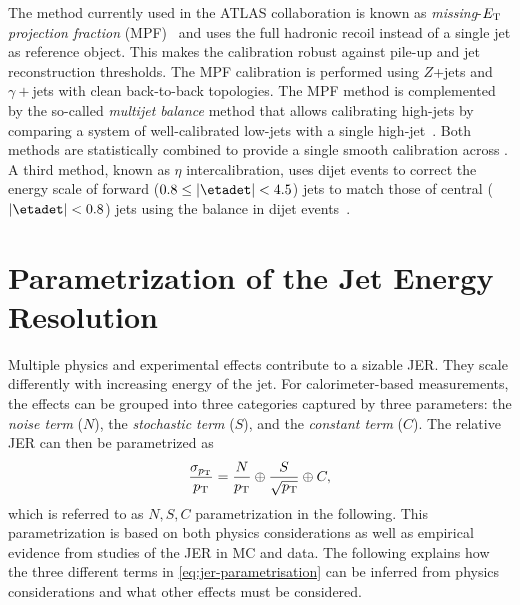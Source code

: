 The method currently used in the ATLAS collaboration is known as \emph{missing}-$E_{\rm T}$ \emph{projection fraction} (MPF)~\cite{PERF-2014-02} and uses the full hadronic recoil instead of a single jet as reference object. This makes the calibration robust against pile-up and jet reconstruction thresholds. The MPF calibration is performed using $Z$+jets and $\gamma+$jets with clean back-to-back topologies. 
The MPF method is complemented by the so-called \emph{multijet balance} method that allows calibrating high-\pT jets by comparing a system of well-calibrated low-\pT jets with a single high-\pT jet~\cite{PERF-2014-02}.
Both methods are statistically combined to provide a single smooth calibration across \pT. 
A third \insitu method, known as $\eta$ intercalibration, uses dijet events to correct the energy scale of forward ($0.8 \leq |\etadet| < 4.5$) jets to match those of central ($|\etadet| < 0.8$) jets using the \pT balance in dijet events~\cite{PERF-2014-02}.


\section{Parametrization of the Jet Energy Resolution}
\label{sec:jer}
Multiple physics and experimental effects contribute to a sizable JER. They scale differently with increasing energy of the jet. For calorimeter-based measurements, the effects can be grouped into three categories captured by three parameters: the \emph{noise term} ($N$), the \emph{stochastic term} ($S$), and the \emph{constant term} ($C$).
The relative JER can then be parametrized as
\begin{equation}
    \label{eq:jer-parametrisation}
    \frac{\sigma_{p_{\rm T}}}{p_{\rm T}} = \frac{N}{p_{\rm T}} \oplus \frac{S}{\sqrt{p_{\rm T}}} \oplus C,
\end{equation}
which is referred to as $N, S, C$ parametrization in the following.
This parametrization is based on both physics considerations as well as empirical evidence from studies of the JER in MC and data.
The following explains how the three different terms in \cref{eq:jer-parametrisation} can be inferred from physics considerations and what other effects must be considered.

